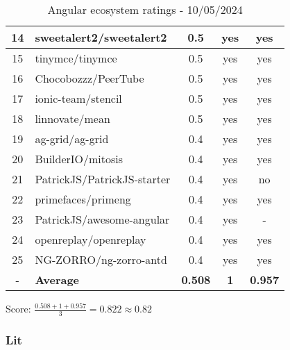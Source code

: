 \begin{table}[H]
{\begin{tabular}{|c|l|c|c|c|}
            14 & sweetalert2/sweetalert2     & 0.5                & yes                        & yes                \\ \hline
            15 & tinymce/tinymce             & 0.5                & yes                        & yes                \\ \hline
            16 & Chocobozzz/PeerTube         & 0.5                & yes                        & yes                \\ \hline
            17 & ionic-team/stencil          & 0.5                & yes                        & yes                \\ \hline
            18 & linnovate/mean              & 0.5                & yes                        & yes                \\ \hline
            19 & ag-grid/ag-grid             & 0.4                & yes                        & yes                \\ \hline
            20 & BuilderIO/mitosis           & 0.4                & yes                        & yes                \\ \hline
            21 & PatrickJS/PatrickJS-starter & 0.4                & yes                        & no                 \\ \hline
            22 & primefaces/primeng          & 0.4                & yes                        & yes                \\ \hline
            23 & PatrickJS/awesome-angular   & 0.4                & yes                        & -                  \\ \hline
            24 & openreplay/openreplay       & 0.4                & yes                        & yes                \\ \hline
            25 & NG-ZORRO/ng-zorro-antd      & 0.4                & yes                        & yes                \\ \hline
            -  & \textbf{Average}            & \textbf{0.508}     & \textbf{1}                 & \textbf{0.957}     \\ \hline
        \end{tabular}
    }
    \caption{Angular ecosystem ratings - 10/05/2024}
    \label{tab:metrics:angular:ratings}
\end{table}

Score: $\frac{0.508 + 1 + 0.957}{3} = 0.822 \approx 0.82$


\subsubsection{Lit}

